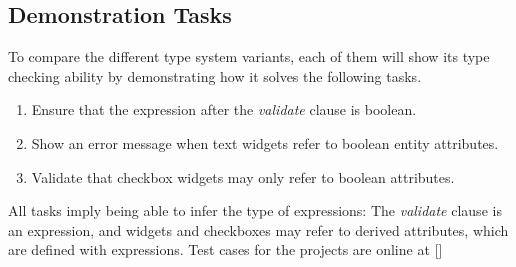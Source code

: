 %

\subsection{Demonstration Tasks}
To compare the different type system variants, each of them will show its type checking ability by demonstrating how it solves the following tasks.
\begin{enumerate}
\item Ensure that the expression after the \emph{validate} clause is boolean.
\item Show an error message when text widgets refer to boolean entity attributes.
\item Validate that checkbox widgets may only refer to boolean attributes.
\end{enumerate}

All tasks imply being able to infer the type of expressions: The \emph{validate} clause is an expression, and widgets and checkboxes may refer to derived attributes, which are defined with expressions. Test cases for the projects are online at []%
